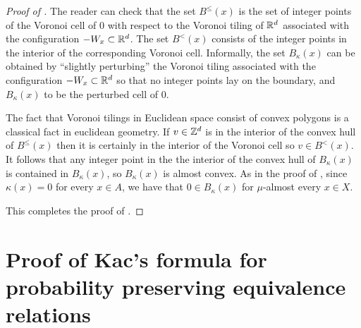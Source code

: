 \documentclass[12pt,reqno]{amsart}
\begin{document}
\begin{proof}[Proof of ]
The reader can check that the set $B^{\le}(x)$ is  the set of integer points of the Voronoi cell of $0$ with respect to the Voronoi tiling of $\mathbb{R}^d$ associated with  the configuration $-W_x \subset \mathbb{R}^d$. The set $B^{<}(x)$ consists of the integer points in the interior of the corresponding Voronoi cell. Informally, the set   $B_\kappa(x)$ can be obtained by ``slightly perturbing'' the Voronoi tiling  associated with  the configuration $-W_x \subset \mathbb{R}^d$ so that no integer points lay on the boundary, and $B_{\kappa}(x)$ to be the perturbed cell of $0$.



The fact that  Voronoi tilings in Euclidean space consist of convex polygons is a classical fact in euclidean geometry.
If $v \in \mathbb{Z}^d$ is in the interior of the convex hull of $B^{\le}(x)$ then
it is certainly in the interior of the Voronoi cell so $v \in B^{<}(x)$.
It follows that any integer point in the the interior of the convex hull of $B_\kappa(x)$ is contained in $B_\kappa(x)$, so $B_{\kappa}(x)$ is almost convex.
As in the proof of , since $\kappa(x) =0$ for every $x \in A$, we have that $0 \in B_{\kappa}(x)$ for $\mu$-almost every $x \in X$.

This completes the proof of .
\end{proof}



\section{Proof of  Kac's formula for probability preserving equivalence relations}
\end{document}
